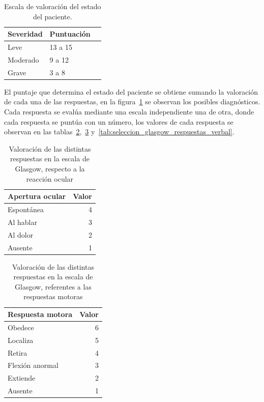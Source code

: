 \begin{table}[!hbt]
\centering
\begin{tabular}{llr}
\toprule
\textbf{Severidad} & 
\textbf{Puntuación} \\ 
\midrule
 Leve & 13 a 15 \\
 Moderado & 9 a 12 \\
 Grave & 3 a 8 \\
\bottomrule
\end{tabular}
\caption{Escala de valoración del estado del paciente\cite{helmick2007mild}.}
\label{tab:seleccion_glasgow_estado}
\end{table}

El puntaje que determina el estado del paciente se obtiene sumando la valoración
de cada una de las respuestas, en la figura~\ref{tab:seleccion_glasgow_estado}
se observan los posibles diagnósticos. Cada respuesta se evalúa
mediante una escala independiente una de otra, donde cada respuesta se puntúa
con un número\cite{glasgow:doc}, los valores de cada respuesta se observan en las
tablas~\ref{tab:seleccion_glasgow_respuestas_ocular},~\ref{tab:seleccion_glasgow_respuestas_motor}
y~\ref{tab:seleccion_glasgow_respuestas_verbal}.

\begin{table}[!hbt]
\centering
\begin{tabular}{lr}
\toprule
\textbf{Apertura ocular} & \textbf{Valor} \\
\midrule
Espontánea & 4 \\
Al hablar & 3 \\
Al dolor & 2 \\
Ausente & 1 \\
\bottomrule
\end{tabular}
\caption{Valoración de las distintas respuestas en la escala de Glasgow,
    respecto a la reacción ocular}
\label{tab:seleccion_glasgow_respuestas_ocular}
\end{table}

\begin{table}[!hbt]
\centering
\begin{tabular}{lr}
\toprule
\textbf{Respuesta motora} & \textbf{Valor} \\
\midrule
Obedece & 6 \\
Localiza & 5 \\
Retira & 4 \\
Flexión anormal & 3 \\
Extiende & 2 \\
Ausente & 1 \\
\bottomrule
\end{tabular}
\caption{Valoración de las distintas respuestas en la escala de Glasgow,
    referentes a las respuestas motoras}
\label{tab:seleccion_glasgow_respuestas_motor}
\end{table}

